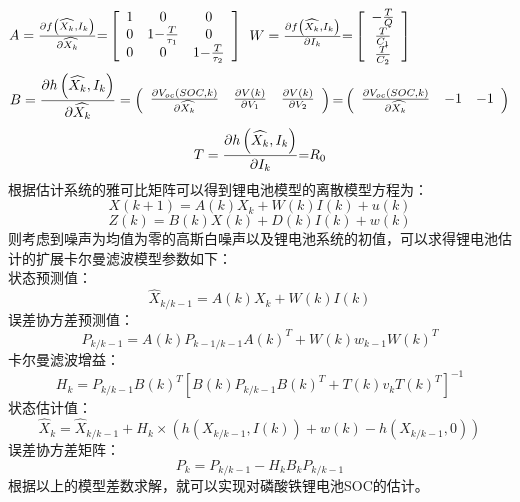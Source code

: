 $A = \frac{{\partial f\left( {\widehat {{X_k}},{I_k}} \right)}}{{\partial \widehat {{X_k}}}}{\rm{ = }}\left[ {\begin{array}{*{20}{c}}
1&0&0\\
0&{1{\rm{ - }}\frac{T}{{{\tau _1}}}}&0\\
0&0&{1{\rm{ - }}\frac{T}{{{\tau _2}}}}
\end{array}} \right]$~$W = \frac{{\partial f\left( {\widehat {{X_k}},{I_k}} \right)}}{{\partial {I_k}}}{\rm{ = }}\left[ {\begin{array}{*{20}{c}}
{ - \frac{T}{Q}}\\
{\frac{T}{{{C_1}}}}\\
{\frac{T}{{{C_2}}}}
\end{array}} \right]$
\[B = \frac{{\partial h\left( {\widehat {{X_k}},{I_k}} \right)}}{{\partial \widehat {{X_k}}}} = \left( {\begin{array}{*{20}{c}}
{\frac{{\partial {V_{oc}}\left( {SOC,k} \right)}}{{\partial \widehat {{X_k}}}}}&{\frac{{\partial V\left( k \right)}}{{\partial {V_1}}}}&{\frac{{\partial V\left( k \right)}}{{\partial {V_2}}}}
\end{array}} \right){\rm{ = }}\left( {\begin{array}{*{20}{c}}
{\frac{{\partial {V_{oc}}\left( {SOC,k} \right)}}{{\partial \widehat {{X_k}}}}}&{{\rm{ - }}1}&{{\rm{ - }}1}
\end{array}} \right)\]
\[T = \frac{{\partial h\left( {\widehat {{X_k}},{I_k}} \right)}}{{\partial {I_k}}}{\rm{ = }}{R_0}\]
根据估计系统的雅可比矩阵可以得到锂电池模型的离散模型方程为：
\begin{equation}
X\left( {k + 1} \right) = A(k){X_k} + W\left( k \right)I\left( k \right) + u\left( k \right)
\end{equation}
\begin{equation}
Z\left( k \right) = B\left( k \right)X(k) + D(k)I(k) + w\left( k \right)
\end{equation}
则考虑到噪声为均值为零的高斯白噪声以及锂电池系统的初值，可以求得锂电池估计的扩展卡尔曼滤波模型参数如下：\\
状态预测值：
\begin{equation}
{\widehat X_{k/k - 1}} = A(k){X_k} + W\left( k \right)I\left( k \right)
\end{equation}
误差协方差预测值：
\begin{equation}
{P_{k/k - 1}} = A(k){P_{k - 1/k - 1}}A{(k)^T} + W(k){w_{k - 1}}W{(k)^T}
\end{equation}
卡尔曼滤波增益：
\begin{equation}
{H_k} = {P_{k/k - 1}}B{(k)^T}{[B(k){P_{k/k - 1}}B{(k)^T} + T(k){v_k}T{(k)^T}]^{ - 1}}
\end{equation}
状态估计值：
\begin{equation}
{\widehat X_k} = {\widehat X_{k/k - 1}} + {H_k} \times \left( {h\left( {{X_{k/k - 1}},I(k)} \right) + w(k) - h\left( {{X_{k/k - 1}},0} \right)} \right)
\end{equation}
误差协方差矩阵：
\begin{equation}
{P_k} = {P_{k/k - 1}} - {H_k}{B_k}{P_{k/k - 1}}
\end{equation}
根据以上的模型差数求解，就可以实现对磷酸铁锂电池SOC的估计。

